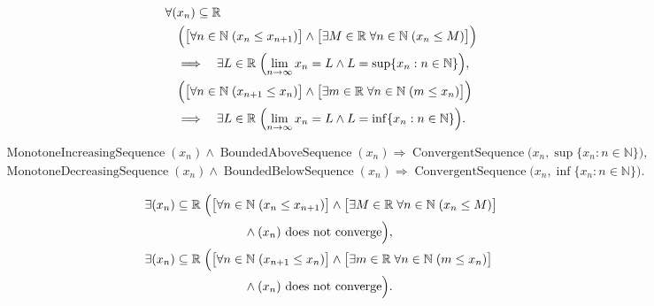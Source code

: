 \begin{remark*}
\[
\begin{aligned}
&\forall (x_n)\subseteq\mathbb{R}\\
&\quad
\Bigl(
  \bigl[\forall n\in\mathbb{N}\;(x_n\le x_{n+1})\bigr]
  \land
  \bigl[\exists M\in\mathbb{R}\;\forall n\in\mathbb{N}\;(x_n\le M)\bigr]
\Bigr)\\
&\quad\Longrightarrow\quad
\exists L\in\mathbb{R}\;\Bigl(
  \lim_{n\to\infty}x_n=L
  \land
  L=\sup\{x_n:n\in\mathbb{N}\}
\Bigr),\\
&\quad
\Bigl(
  \bigl[\forall n\in\mathbb{N}\;(x_{n+1}\le x_n)\bigr]
  \land
  \bigl[\exists m\in\mathbb{R}\;\forall n\in\mathbb{N}\;(m\le x_n)\bigr]
\Bigr)\\
&\quad\Longrightarrow\quad
\exists L\in\mathbb{R}\;\Bigl(
  \lim_{n\to\infty}x_n=L
  \land
  L=\inf\{x_n:n\in\mathbb{N}\}
\Bigr).
\end{aligned}
\]
\end{remark*}

\begin{remark*}
\[
\begin{aligned}
&\operatorname{MonotoneIncreasingSequence}(x_n)
\land
\operatorname{BoundedAboveSequence}(x_n)
\Longrightarrow
\operatorname{ConvergentSequence}\bigl(x_n,\sup\{x_n:n\in\mathbb{N}\}\bigr),\\
&\operatorname{MonotoneDecreasingSequence}(x_n)
\land
\operatorname{BoundedBelowSequence}(x_n)
\Longrightarrow
\operatorname{ConvergentSequence}\bigl(x_n,\inf\{x_n:n\in\mathbb{N}\}\bigr).
\end{aligned}
\]
\end{remark*}

\begin{remark*}
\[
\begin{aligned}
&\exists (x_n)\subseteq\mathbb{R}\;\Bigl(
  \bigl[\forall n\in\mathbb{N}\;(x_n\le x_{n+1})\bigr]
  \land
  \bigl[\exists M\in\mathbb{R}\;\forall n\in\mathbb{N}\;(x_n\le M)\bigr]\\
&\qquad\qquad\qquad\qquad
  \land
  \text{$(x_n)$ does not converge}
\Bigr),\\
&\exists (x_n)\subseteq\mathbb{R}\;\Bigl(
  \bigl[\forall n\in\mathbb{N}\;(x_{n+1}\le x_n)\bigr]
  \land
  \bigl[\exists m\in\mathbb{R}\;\forall n\in\mathbb{N}\;(m\le x_n)\bigr]\\
&\qquad\qquad\qquad\qquad
  \land
  \text{$(x_n)$ does not converge}
\Bigr).
\end{aligned}
\]
\end{remark*}


